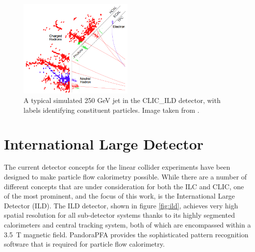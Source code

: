 \begin{figure}[h!]
\centering
\includegraphics[width=0.5\textwidth]{LCDetectorsAndPFlow/Plots/Pictures/PFlow.png}
\caption[A typical simulated 250 GeV jet in the CLIC\_ILD detector, with labels identifying constituent particles.  Image taken from  \cite{arXiv:1209.4039}.]{A typical simulated 250 GeV jet in the CLIC\_ILD detector, with labels identifying constituent particles.  Image taken from  \cite{arXiv:1209.4039}.}
\label{fig:particleflowpic}
\end{figure} 


\section{International Large Detector}
\label{sec:ild}
The current detector concepts for the linear collider experiments have been designed to make particle flow calorimetry possible.  While there are a number of different concepts that are under consideration for both the ILC and CLIC, one of the most prominent, and the focus of this work, is the International Large Detector (ILD).  The ILD detector, shown in figure \ref{fig:ild}, achieves very high spatial resolution for all sub-detector systems thanks to its highly segmented calorimeters and central tracking system, both of which are encompassed within a 3.5~T magnetic field.  PandoraPFA \cite{arXiv:1209.4039, arXiv:0907.3577} provides the sophisticated pattern recognition software that is required for particle flow calorimetry.   

